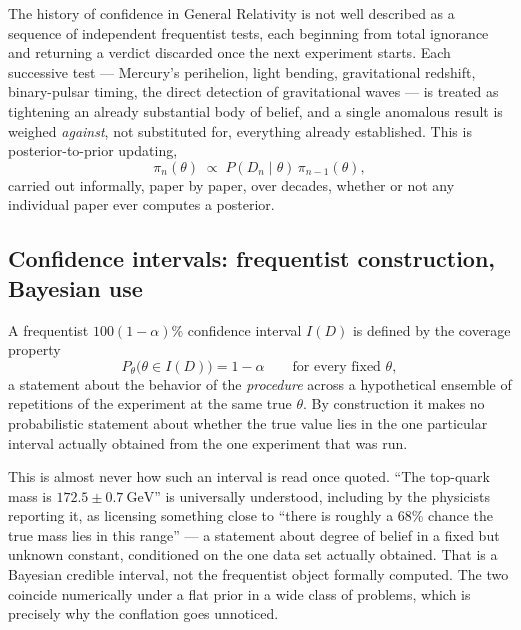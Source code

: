 The history of confidence in General Relativity is not well described as a
sequence of independent frequentist tests, each beginning from total ignorance
and returning a verdict discarded once the next experiment starts. Each
successive test --- Mercury's perihelion, light bending, gravitational
redshift, binary-pulsar timing, the direct detection of gravitational waves ---
is treated as tightening an already substantial body of belief, and a single
anomalous result is weighed \emph{against}, not substituted for, everything
already established. This is posterior-to-prior updating,
\begin{equation}
\pi_n(\theta) \;\propto\; P(D_n \mid \theta)\,\pi_{n-1}(\theta),
\end{equation}
carried out informally, paper by paper, over decades, whether or not any
individual paper ever computes a posterior.

\subsection{Confidence intervals: frequentist construction, Bayesian use}

A frequentist $100(1-\alpha)\%$ confidence interval $I(D)$ is defined by the
coverage property
\begin{equation}
P_\theta\big(\theta \in I(D)\big) = 1-\alpha \qquad \text{for every fixed } \theta,
\end{equation}
a statement about the behavior of the \emph{procedure} across a hypothetical
ensemble of repetitions of the experiment at the same true $\theta$. By
construction it makes no probabilistic statement about whether the true value
lies in the one particular interval actually obtained from the one experiment
that was run.

\begin{remark}
This is almost never how such an interval is read once quoted. ``The top-quark
    mass is $172.5 \pm 0.7\ \mathrm{GeV}$'' is universally understood,
    including by the physicists reporting it, as licensing something close to
    ``there is roughly a 68\% chance the true mass lies in this range'' --- a
    statement about degree of belief in a fixed but unknown constant,
    conditioned on the one data set actually obtained. That is a Bayesian
    credible interval, not the frequentist object formally computed. The two
    coincide numerically under a flat prior in a wide class of problems, which
    is precisely why the conflation goes unnoticed.
\end{remark}

